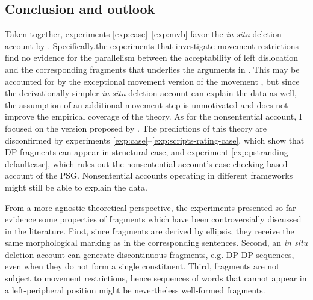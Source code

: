 \subsection{Conclusion and outlook}

Taken together, experiments \ref{exp:case}--\ref{exp:mvb} favor the \textit{in situ} deletion account by \citet{reich2007}. Specifically,the experiments that investigate movement restrictions find no evidence for the parallelism between the acceptability of left dislocation and the corresponding fragments that underlies the arguments in \citet{merchant2004}. This may be accounted for by the exceptional movement version of the movement \citep{weir2014}, but since the derivationally simpler \textit{in situ} deletion account can explain the data as well, the assumption of an additional movement step is unmotivated and does not improve the empirical coverage of the theory. As for the nonsentential account, I focused on the version proposed by \citet{barton.progovac2005}. The predictions of this theory are disconfirmed by experiments \ref{exp:case}--\ref{exp:scripts-rating-case}, which show that DP fragments can appear in structural case, and experiment \ref{exp:pstranding-defaultcase}, which rules out the nonsentential account's case checking-based account of the PSG. Nonsentential accounts operating in different frameworks \citep[e.g.][]{ginzburg.sag2000, fernandez.ginzburg2002, culicover.jackendoff2005} might still be able to explain the data.

From a more agnostic theoretical perspective, the experiments presented so far evidence some properties of fragments which have been controversially discussed in the literature. First, since fragments are derived by ellipsis, they receive the same morphological marking as in the corresponding sentences. Second, an \textit{in situ} deletion account can generate discontinuous fragments, e.g. DP-DP sequences, even when they do not form a single constituent. Third, fragments are not subject to movement restrictions, hence sequences of words that cannot appear in a left-peripheral position might be nevertheless well-formed fragments. 


